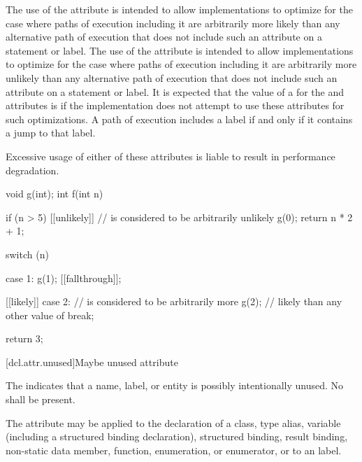 \pnum
\begin{note}
The use of the  attribute
is intended to allow implementations to optimize for
the case where paths of execution including it
are arbitrarily more likely
than any alternative path of execution
that does not include such an attribute on a statement or label.
The use of the  attribute
is intended to allow implementations to optimize for
the case where paths of execution including it
are arbitrarily more unlikely
than any alternative path of execution
that does not include such an attribute on a statement or label.
It is expected that the value of a 
for the  and  attributes
is 
if the implementation does not attempt to use these attributes
for such optimizations.
A path of execution includes a label
if and only if it contains a jump to that label.
\end{note}
\begin{note}
Excessive usage of either of these attributes
is liable to result in performance degradation.
\end{note}

\pnum
\begin{example}
\begin{codeblock}
void g(int);
int f(int n) {
  if (n > 5) [[unlikely]] {     //  is considered to be arbitrarily unlikely
    g(0);
    return n * 2 + 1;
  }

  switch (n) {
  case 1:
    g(1);
    [[fallthrough]];

  [[likely]] case 2:            //  is considered to be arbitrarily more
    g(2);                       // likely than any other value of 
    break;
  }
  return 3;
}
\end{codeblock}
\end{example}

[dcl.attr.unused]{Maybe unused attribute}%

\pnum
The  
indicates that a name, label, or entity is possibly intentionally unused.
No  shall be present.

\pnum
The attribute may be applied to the declaration of a class,
type alias,
variable (including a structured binding declaration),
structured binding,
result binding,
non-static data member,
function,
enumeration, or
enumerator, or
to an  label.

